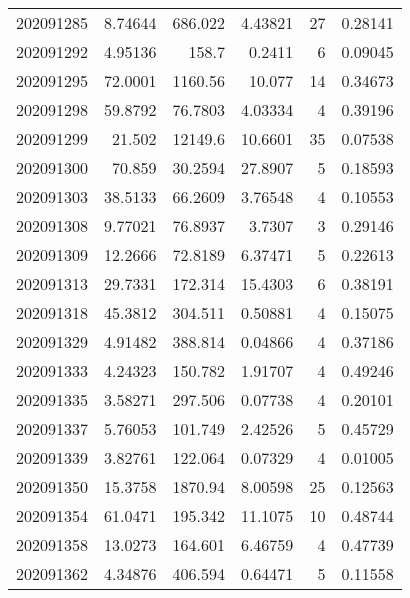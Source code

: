 \begin{tabular}{rrrrrr}
 202091285 &          8.74644 &      686.022  &            4.43821 &          27 & 0.28141 \\
 202091292 &          4.95136 &      158.7    &            0.2411  &           6 & 0.09045 \\
 202091295 &         72.0001  &     1160.56   &           10.077   &          14 & 0.34673 \\
 202091298 &         59.8792  &       76.7803 &            4.03334 &           4 & 0.39196 \\
 202091299 &         21.502   &    12149.6    &           10.6601  &          35 & 0.07538 \\
 202091300 &         70.859   &       30.2594 &           27.8907  &           5 & 0.18593 \\
 202091303 &         38.5133  &       66.2609 &            3.76548 &           4 & 0.10553 \\
 202091308 &          9.77021 &       76.8937 &            3.7307  &           3 & 0.29146 \\
 202091309 &         12.2666  &       72.8189 &            6.37471 &           5 & 0.22613 \\
 202091313 &         29.7331  &      172.314  &           15.4303  &           6 & 0.38191 \\
 202091318 &         45.3812  &      304.511  &            0.50881 &           4 & 0.15075 \\
 202091329 &          4.91482 &      388.814  &            0.04866 &           4 & 0.37186 \\
 202091333 &          4.24323 &      150.782  &            1.91707 &           4 & 0.49246 \\
 202091335 &          3.58271 &      297.506  &            0.07738 &           4 & 0.20101 \\
 202091337 &          5.76053 &      101.749  &            2.42526 &           5 & 0.45729 \\
 202091339 &          3.82761 &      122.064  &            0.07329 &           4 & 0.01005 \\
 202091350 &         15.3758  &     1870.94   &            8.00598 &          25 & 0.12563 \\
 202091354 &         61.0471  &      195.342  &           11.1075  &          10 & 0.48744 \\
 202091358 &         13.0273  &      164.601  &            6.46759 &           4 & 0.47739 \\
 202091362 &          4.34876 &      406.594  &            0.64471 &           5 & 0.11558 \\

\end{tabular}
